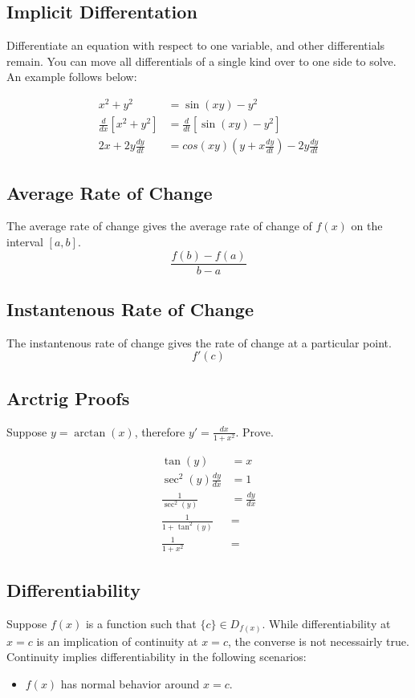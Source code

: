 \subsection{Implicit Differentation}
Differentiate an equation with respect to one variable, and other differentials
remain. You can move all differentials of a single kind over to one side to
solve. An example follows below:

\begin{align*}
  x^2+y^2 &= \sin(xy)-y^2 \\
  \frac{d}{dx}[x^2+y^2] &= \frac{d}{dt}[\sin(xy)-y^2] \\
  2x+2y\frac{dy}{dt} &= cos(xy)\left(y+x\frac{dy}{dt}\right)-2y\frac{dy}{dt}
\end{align*}

\subsection{Average Rate of Change}
The average rate of change gives the average rate of change of $f(x)$ on the
interval $[a,b]$.
\begin{equation}
  \frac{f(b)-f(a)}{b-a}
\end{equation}

\subsection{Instantenous Rate of Change}
The instantenous rate of change gives the rate of change at a particular point.
\begin{equation}
  f'(c)
\end{equation}

\subsection{Arctrig Proofs}
Suppose $y=\arctan(x)$, therefore $y'=\frac{dx}{1+x^2}$. Prove.

\begin{equation}
\begin{aligned}
  \tan(y) &= x \\
  \sec^2(y)\frac{dy}{dx} &= 1 \\
  \frac{1}{\sec^2(y)} &= \frac{dy}{dx} \\
  \frac{1}{1+\tan^2(y)} &= \\
  \frac{1}{1+x^2} &=
\end{aligned}
\end{equation}

\subsection{Differentiability}
Suppose $f(x)$ is a function such that $\{c\} \in D_{f(x)}$. While
differentiability at $x=c$ is an implication of continuity at $x=c$, the
converse is not necessairly true. Continuity implies differentiability in the
following scenarios:
\begin{itemize}
  \item $f(x)$ has normal behavior around $x=c$.
\end{itemize}

